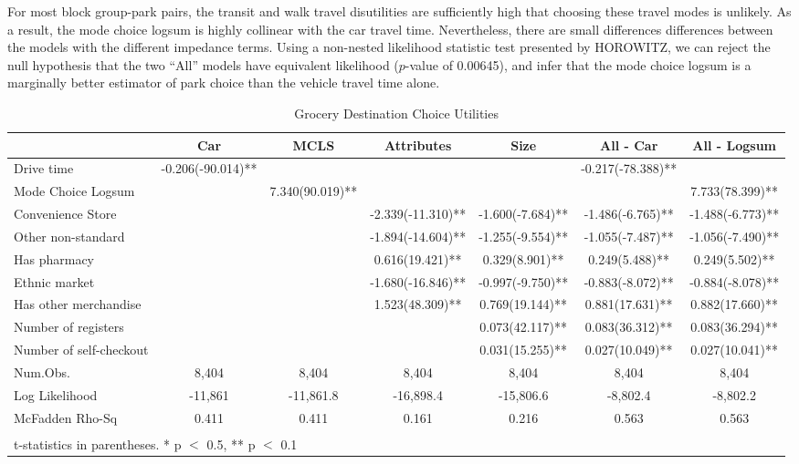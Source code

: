 \documentclass[3p, authoryear]{elsarticle} %
\begin{document}
For most block group-park pairs, the transit and walk travel disutilities
are sufficiently high that choosing these travel modes is unlikely. As a
result, the mode choice logsum is highly collinear with the car travel time.
Nevertheless, there are small differences differences between the models
with the different impedance terms. Using a non-nested likelihood statistic
test presented by HOROWITZ, we can reject the null hypothesis that the two
``All'' models have equivalent likelihood (\(p\)-value of 0.00645), and infer
that the mode choice logsum is a marginally better estimator of park choice than
the vehicle travel time alone.

\begin{landscape}\begin{table}

\caption{\label{tab:grocery-models}Grocery Destination Choice Utilities}
\centering
\begin{tabular}[t]{lcccccc}
\toprule
  & Car & MCLS & Attributes & Size & All - Car & All - Logsum\\
\midrule
Drive time & -0.206(-90.014)** &  &  &  & -0.217(-78.388)** & \\
Mode Choice Logsum &  & 7.340(90.019)** &  &  &  & 7.733(78.399)**\\
Convenience Store &  &  & -2.339(-11.310)** & -1.600(-7.684)** & -1.486(-6.765)** & -1.488(-6.773)**\\
Other non-standard &  &  & -1.894(-14.604)** & -1.255(-9.554)** & -1.055(-7.487)** & -1.056(-7.490)**\\
Has pharmacy &  &  & 0.616(19.421)** & 0.329(8.901)** & 0.249(5.488)** & 0.249(5.502)**\\
Ethnic market &  &  & -1.680(-16.846)** & -0.997(-9.750)** & -0.883(-8.072)** & -0.884(-8.078)**\\
Has other merchandise &  &  & 1.523(48.309)** & 0.769(19.144)** & 0.881(17.631)** & 0.882(17.660)**\\
Number of registers &  &  &  & 0.073(42.117)** & 0.083(36.312)** & 0.083(36.294)**\\
Number of self-checkout &  &  &  & 0.031(15.255)** & 0.027(10.049)** & 0.027(10.041)**\\
\midrule
Num.Obs. & 8,404 & 8,404 & 8,404 & 8,404 & 8,404 & 8,404\\
Log Likelihood & -11,861 & -11,861.8 & -16,898.4 & -15,806.6 & -8,802.4 & -8,802.2\\
McFadden Rho-Sq & 0.411 & 0.411 & 0.161 & 0.216 & 0.563 & 0.563\\
\bottomrule
\multicolumn{7}{l}{\textsuperscript{} t-statistics in parentheses. * p $<$ 0.5, ** p $<$ 0.1}\\
\end{tabular}
\end{table}
\end{landscape}
\end{document}
